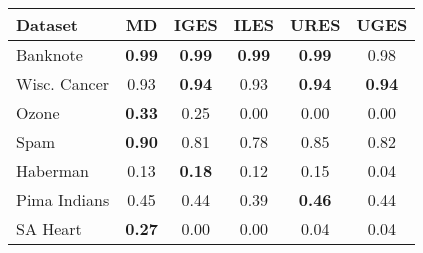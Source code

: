 \begin{tabular}{lccccc}
\toprule
Dataset & MD & IGES & ILES & URES & UGES \\
\midrule
Banknote & \textbf{0.99} & \textbf{0.99} & \textbf{0.99} & \textbf{0.99} & 0.98 \\
Wisc. Cancer & 0.93 & \textbf{0.94} & 0.93 & \textbf{0.94} & \textbf{0.94} \\
Ozone & \textbf{0.33} & 0.25 & 0.00 & 0.00 & 0.00 \\
Spam & \textbf{0.90} & 0.81 & 0.78 & 0.85 & 0.82 \\
Haberman & 0.13 & \textbf{0.18} & 0.12 & 0.15 & 0.04 \\
Pima Indians & 0.45 & 0.44 & 0.39 & \textbf{0.46} & 0.44 \\
SA Heart & \textbf{0.27} & 0.00 & 0.00 & 0.04 & 0.04 \\
\bottomrule
\end{tabular}
